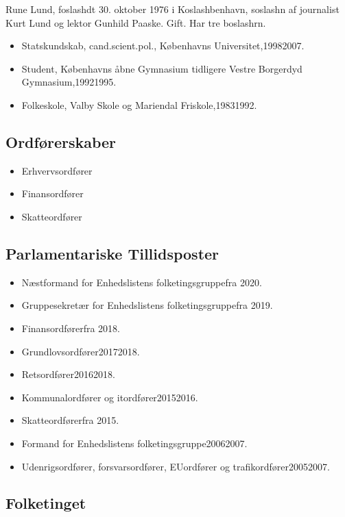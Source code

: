 \documentclass[11pt, a4paper]{awesome-cv}
\begin{document}
\makecvheader[R]
\makelettertitle
\begin{cvletter}
Rune Lund, foslashdt 30. oktober 1976 i Koslashbenhavn, soslashn af journalist Kurt Lund og lektor Gunhild Paaske. Gift. Har tre boslashrn.

\begin{itemize}
\item Statskundskab, cand.scient.pol., Københavns Universitet,19982007.
\item Student, Københavns åbne Gymnasium tidligere Vestre Borgerdyd Gymnasium,19921995.
\item Folkeskole, Valby Skole og Mariendal Friskole,19831992.
\end{itemize}
\subsection*{Ordførerskaber}
\begin{itemize}
\item Erhvervsordfører
\item Finansordfører
\item Skatteordfører
\end{itemize}
\subsection*{Parlamentariske Tillidsposter}
\begin{itemize}
\item Næstformand for Enhedslistens folketingsgruppefra 2020.
\item Gruppesekretær for Enhedslistens folketingsgruppefra 2019.
\item Finansordførerfra 2018.
\item Grundlovsordfører20172018.
\item Retsordfører20162018.
\item Kommunalordfører og itordfører20152016.
\item Skatteordførerfra 2015.
\item Formand for Enhedslistens folketingsgruppe20062007.
\item Udenrigsordfører, forsvarsordfører, EUordfører og trafikordfører20052007.
\end{itemize}
\subsection*{Folketinget}

\end{cvletter}
\end{document}
